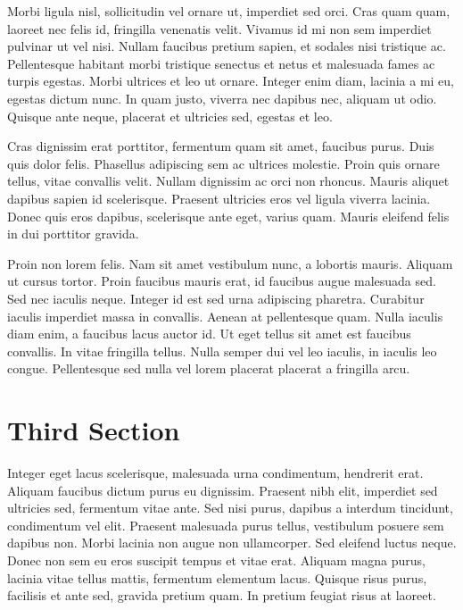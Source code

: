 \documentclass[openright]{book} %
\begin{document}
Morbi ligula nisl, sollicitudin vel ornare ut, imperdiet sed orci. Cras quam quam, laoreet nec felis id, fringilla venenatis velit. Vivamus id mi non sem imperdiet pulvinar ut vel nisi. Nullam faucibus pretium sapien, et sodales nisi tristique ac. Pellentesque habitant morbi tristique senectus et netus et malesuada fames ac turpis egestas. Morbi ultrices et leo ut ornare. Integer enim diam, lacinia a mi eu, egestas dictum nunc. In quam justo, viverra nec dapibus nec, aliquam ut odio. Quisque ante neque, placerat et ultricies sed, egestas et leo.

Cras dignissim erat porttitor, fermentum quam sit amet, faucibus purus. Duis quis dolor felis. Phasellus adipiscing sem ac ultrices molestie. Proin quis ornare tellus, vitae convallis velit. Nullam dignissim ac orci non rhoncus. Mauris aliquet dapibus sapien id scelerisque. Praesent ultricies eros vel ligula viverra lacinia. Donec quis eros dapibus, scelerisque ante eget, varius quam. Mauris eleifend felis in dui porttitor gravida.

Proin non lorem felis. Nam sit amet vestibulum nunc, a lobortis mauris. Aliquam ut cursus tortor. Proin faucibus mauris erat, id faucibus augue malesuada sed. Sed nec iaculis neque. Integer id est sed urna adipiscing pharetra. Curabitur iaculis imperdiet massa in convallis. Aenean at pellentesque quam. Nulla iaculis diam enim, a faucibus lacus auctor id. Ut eget tellus sit amet est faucibus convallis. In vitae fringilla tellus. Nulla semper dui vel leo iaculis, in iaculis leo congue. Pellentesque sed nulla vel lorem placerat placerat a fringilla arcu.

\section{Third Section} %

Integer eget lacus scelerisque, malesuada urna condimentum, hendrerit erat. Aliquam faucibus dictum purus eu dignissim. Praesent nibh elit, imperdiet sed ultricies sed, fermentum vitae ante. Sed nisi purus, dapibus a interdum tincidunt, condimentum vel elit. Praesent malesuada purus tellus, vestibulum posuere sem dapibus non. Morbi lacinia non augue non ullamcorper. Sed eleifend luctus neque. Donec non sem eu eros suscipit tempus et vitae erat. Aliquam magna purus, lacinia vitae tellus mattis, fermentum elementum lacus. Quisque risus purus, facilisis et ante sed, gravida pretium quam. In pretium feugiat risus at laoreet.
\end{document}

